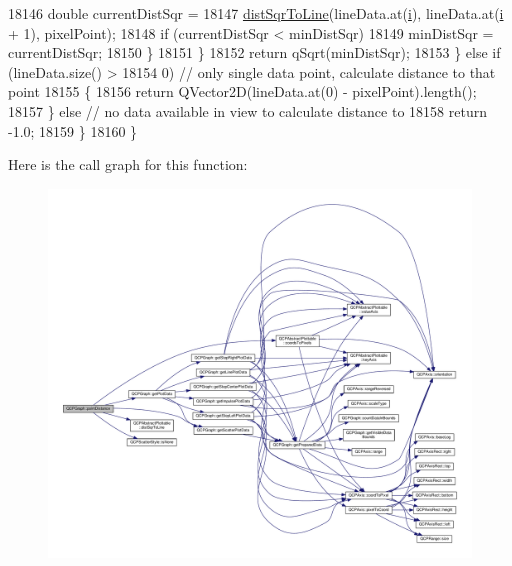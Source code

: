 \begin{DoxyCode}
18146           \textcolor{keywordtype}{double} currentDistSqr =
18147               \hyperlink{class_q_c_p_abstract_plottable_a5ea1cab44ca912dcdc96ed81ec5bed5d}{distSqrToLine}(lineData.at(\hyperlink{_comparision_pictures_2_createtest_image_8m_a6f6ccfcf58b31cb6412107d9d5281426}{i}), lineData.at(\hyperlink{_comparision_pictures_2_createtest_image_8m_a6f6ccfcf58b31cb6412107d9d5281426}{i} + 1), pixelPoint);
18148           \textcolor{keywordflow}{if} (currentDistSqr < minDistSqr)
18149             minDistSqr = currentDistSqr;
18150         \}
18151       \}
18152       \textcolor{keywordflow}{return} qSqrt(minDistSqr);
18153     \} \textcolor{keywordflow}{else} \textcolor{keywordflow}{if} (lineData.size() >
18154                0) \textcolor{comment}{// only single data point, calculate distance to that point}
18155     \{
18156       \textcolor{keywordflow}{return} QVector2D(lineData.at(0) - pixelPoint).length();
18157     \} \textcolor{keywordflow}{else} \textcolor{comment}{// no data available in view to calculate distance to}
18158       \textcolor{keywordflow}{return} -1.0;
18159   \}
18160 \}
\end{DoxyCode}


Here is the call graph for this function\+:\nopagebreak
\begin{figure}[H]
\begin{center}
\leavevmode
\includegraphics[width=350pt]{class_q_c_p_graph_af93762a12a481a7edb4b3dd9e330dff1_cgraph}
\end{center}
\end{figure}




